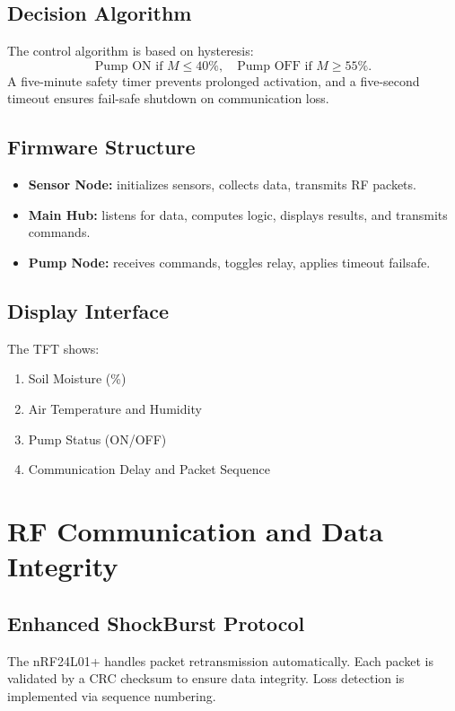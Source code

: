 \documentclass[12pt,a4paper]{article}
\begin{document}
\subsection{Decision Algorithm}
The control algorithm is based on hysteresis:
\[
\text{Pump ON if } M \leq 40\%, \quad \text{Pump OFF if } M \geq 55\%.
\]
A five-minute safety timer prevents prolonged activation, and a five-second timeout ensures fail-safe shutdown on communication loss.

\subsection{Firmware Structure}
\begin{itemize}
  \item \textbf{Sensor Node:} initializes sensors, collects data, transmits RF packets.
  \item \textbf{Main Hub:} listens for data, computes logic, displays results, and transmits commands.
  \item \textbf{Pump Node:} receives commands, toggles relay, applies timeout failsafe.
\end{itemize}

\subsection{Display Interface}
The TFT shows:
\begin{enumerate}
  \item Soil Moisture (\%)
  \item Air Temperature and Humidity
  \item Pump Status (ON/OFF)
  \item Communication Delay and Packet Sequence
\end{enumerate}

\clearpage
\section{RF Communication and Data Integrity}

\subsection{Enhanced ShockBurst Protocol}
The nRF24L01+ handles packet retransmission automatically. Each packet is validated by a CRC checksum to ensure data integrity. Loss detection is implemented via sequence numbering.
\end{document}
